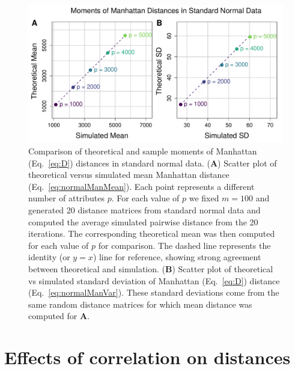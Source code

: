 \documentclass[aos]{imsart}
\begin{document}
\begin{figure}[H]
	\centering
	\includegraphics[scale = 0.4]{compared_moments_normal_manhattan5.pdf}
	\caption{Comparison of theoretical and sample moments of Manhattan (Eq.~\ref{eq:D}) distances in standard normal data. (\textbf{A}) Scatter plot of theoretical versus simulated mean Manhattan distance (Eq.~\ref{eq:normalManMean}). Each point represents a different number of attributes $p$. For each value of $p$ we fixed $m=100$ and generated 20 distance matrices from standard normal data and computed the average simulated pairwise distance from the 20 iterations. The corresponding theoretical mean was then computed for each value of $p$ for comparison. The dashed line represents the identity (or $y=x$) line for reference, showing strong agreement between theoretical and simulation. (\textbf{B}) Scatter plot of theoretical vs simulated standard deviation of Manhattan (Eq.~\ref{eq:D}) distance (Eq.~\ref{eq:normalManVar}). These standard deviations come from the same random distance matrices for which mean distance was computed for \textbf{A}.}\label{fig:compare_theoretical_sample_moments}
\end{figure}

\section{Effects of correlation on distances}\label{sec:correlation}
\end{document}
